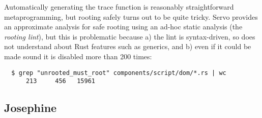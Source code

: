 Automatically generating the trace function is reasonably straightforward
metaprogramming, but rooting safely turns out to be quite tricky.
Servo provides an approximate analysis for safe rooting using an ad-hoc
static analysis (the \emph{rooting lint}), but this is problematic because
a) the lint is syntax-driven, so does not understand about Rust features
such as generics, and b) even if it could be made sound it is disabled
more than 200 times:
\begin{verbatim}
  $ grep "unrooted_must_root" components/script/dom/*.rs | wc
      213     456   15961
\end{verbatim}

\subsection{Josephine}

